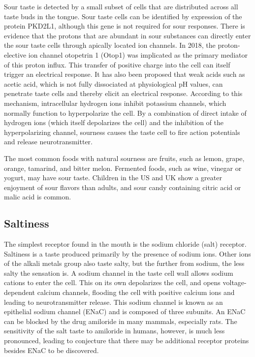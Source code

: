 \documentclass[]{book}
\begin{document}
Sour taste is detected by a small subset of cells that are distributed across all taste buds in the tongue. Sour taste cells can be identified by expression of the protein PKD2L1, although this gene is not required for sour responses. There is evidence that the protons that are abundant in sour substances can directly enter the sour taste cells through apically located ion channels. In 2018, the proton-elective ion channel otopetrin 1 (Otop1) was implicated as the primary mediator of this proton influx. This transfer of positive charge into the cell can itself trigger an electrical response. It has also been proposed that weak acids such as acetic acid, which is not fully dissociated at physiological pH values, can penetrate taste cells and thereby elicit an electrical response. According to this mechanism, intracellular hydrogen ions inhibit potassium channels, which normally function to hyperpolarize the cell. By a combination of direct intake of hydrogen ions (which itself depolarizes the cell) and the inhibition of the hyperpolarizing channel, sourness causes the taste cell to fire action potentials and release neurotransmitter.

The most common foods with natural sourness are fruits, such as lemon, grape, orange, tamarind, and bitter melon. Fermented foods, such as wine, vinegar or yogurt, may have sour taste. Children in the US and UK show a greater enjoyment of sour flavors than adults, and sour candy containing citric acid or malic acid is common.

\hypertarget{saltiness}{%
\subsection{Saltiness}\label{saltiness}}

The simplest receptor found in the mouth is the sodium chloride (salt) receptor. Saltiness is a taste produced primarily by the presence of sodium ions. Other ions of the alkali metals group also taste salty, but the further from sodium, the less salty the sensation is. A sodium channel in the taste cell wall allows sodium cations to enter the cell. This on its own depolarizes the cell, and opens voltage-dependent calcium channels, flooding the cell with positive calcium ions and leading to neurotransmitter release. This sodium channel is known as an epithelial sodium channel (ENaC) and is composed of three subunits. An ENaC can be blocked by the drug amiloride in many mammals, especially rats. The sensitivity of the salt taste to amiloride in humans, however, is much less pronounced, leading to conjecture that there may be additional receptor proteins besides ENaC to be discovered.
\end{document}
